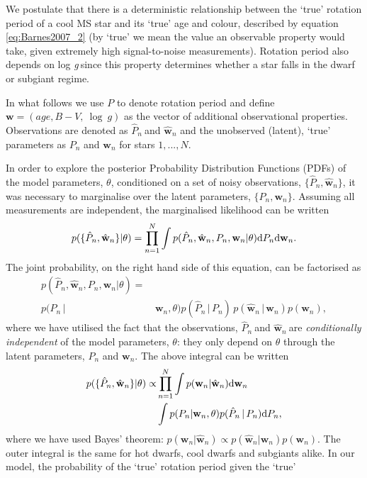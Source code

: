 \documentclass[useAMS, usenatbib]{mn2e}
\newcommand{\logg}{log \emph{g}}
\newcommand{\w}{\mathbf{w}}
\newcommand{\wh}{$\hat{\mathbf{w}}_n$}
\newcommand{\ph}{$\hat{P}_n$}
\begin{document}
We postulate that there is a deterministic relationship between the `true'
rotation period of a cool MS star and its `true' age and colour, described by
equation \ref{eq:Barnes2007_2} (by `true' we mean the value an observable
property would take, given extremely high signal-to-noise measurements).
Rotation period also depends on \logg$~$since this property determines whether
a star falls in the dwarf or subgiant regime.

In what follows we use $P$ to denote rotation period and define
$\mathbf{w} = (age, B-V,~\log~g)$ as the vector of additional observational
properties.
Observations are denoted as \ph$~$and $\hat{\mathbf{w}}_n$ and the unobserved
(latent), `true' parameters as $P_n$ and $\mathbf{w}_n$ for stars $1,...,N$.

In order to explore the posterior Probability Distribution Functions (PDFs) of
the model parameters, $\theta$, conditioned on a set of noisy observations,
$\{\hat{P}_n, \hat{\mathbf{w}}_n\}$, it was necessary to marginalise over the
latent parameters, $\{P_n, \mathbf{w}_n\}$.
Assuming all measurements are independent, the marginalised likelihood can be
written
\begin{equation}
	p(\{\hat{P}_n,\hat{\w}_n\}|\theta) =
	\prod_{n=1}^{N} \int p(\hat{P}_n,\hat{\w}_n,P_n,\w_n|\theta)
	{\rm d}P_n {\rm d}\w_n.
\label{eq:fulll}
\end{equation}
The joint probability, on the right hand side of this equation, can be
factorised as
\begin{align}
	p(\hat{P}_n,\hat{\w}_n,P_n,\w_n|\theta) = & \\
	p(P_n\,| & \,\w_n,\theta)
	p(\hat{P}_n\,|\,P_n)\,p(\hat{\w}_n\,|\,\w_n)p(\w_n),
\nonumber
\end{align}
where we have utilised the fact that the observations, \ph$~$and \wh$~$are
{\it conditionally independent} of the model parameters, $\theta$: they only
depend on $\theta$ through the latent parameters, $P_n$ and $\w_n$.
The above integral can  be written
\begin{eqnarray}
	p(\{\hat{P}_n,\hat{\w}_n\}|\theta) \propto &
	\prod_{n=1}^{N} \int p(\w_n|\hat{\w}_n) {\rm d}\w_n \\ \nonumber
	& \int p(P_n|\w_n,\theta) p(\hat{P}_n\,|\,P_n) {\rm d}P_n,
\label{eq:fac}
\end{eqnarray}
where we have used Bayes' theorem:
$p(\w_n|\hat{\w}_n) \propto p(\hat{\w}_n|\w_n)p(\w_n)$.
The outer integral is the same for hot dwarfs, cool dwarfs and subgiants
alike.
In our model, the probability of the `true' rotation period given the `true'
\end{document}
